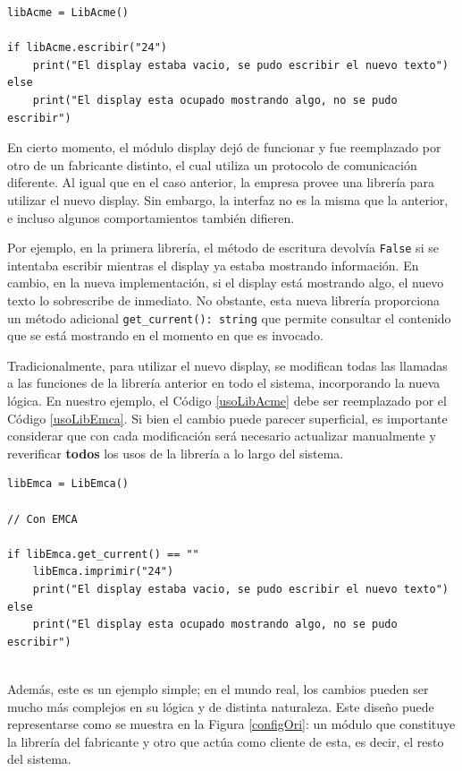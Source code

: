 \begin{lstlisting}[label={usoLibAcme}, caption=Ejemplo de uso de la libreria LibAcme.]
libAcme = LibAcme()

if libAcme.escribir("24")
    print("El display estaba vacio, se pudo escribir el nuevo texto")
else
    print("El display esta ocupado mostrando algo, no se pudo escribir")

\end{lstlisting}

En cierto momento, el módulo display dejó de funcionar y fue reemplazado por otro de un fabricante distinto, el cual utiliza un protocolo de comunicación diferente. Al igual que en el caso anterior, la empresa provee una librería \LibEmca para utilizar el nuevo display. Sin embargo, la interfaz no es la misma que la anterior, e incluso algunos comportamientos también difieren.

Por ejemplo, en la primera librería, el método de escritura devolvía \verb|False| si se intentaba escribir mientras el display ya estaba mostrando información. En cambio, en la nueva implementación, si el display está mostrando algo, el nuevo texto lo sobrescribe de inmediato. No obstante, esta nueva librería proporciona un método adicional \verb|get_current(): string| que permite consultar el contenido que se está mostrando en el momento en que es invocado.

Tradicionalmente, para utilizar el nuevo display, se modifican todas las llamadas a las funciones de la librería anterior en todo el sistema, incorporando la nueva lógica. En nuestro ejemplo, el Código \ref{usoLibAcme} debe ser reemplazado por el Código \ref{usoLibEmca}. Si bien el cambio puede parecer superficial, es importante considerar que con cada modificación será necesario actualizar manualmente y reverificar \textbf{todos} los usos de la librería a lo largo del sistema.
\begin{lstlisting}[label={usoLibEmca}, caption=Ejemplo de modificaciones necesarias para adaptar la nueva librería.]
libEmca = LibEmca()

// Con EMCA

if libEmca.get_current() == ""
    libEmca.imprimir("24")
    print("El display estaba vacio, se pudo escribir el nuevo texto")
else
    print("El display esta ocupado mostrando algo, no se pudo escribir")


\end{lstlisting}

Además, este es un ejemplo simple; en el mundo real, los cambios pueden ser mucho más complejos en su lógica y de distinta naturaleza. Este diseño puede representarse como se muestra en la Figura \ref{configOri}: un módulo que constituye la librería del fabricante y otro que actúa como cliente de esta, es decir, el resto del sistema.


